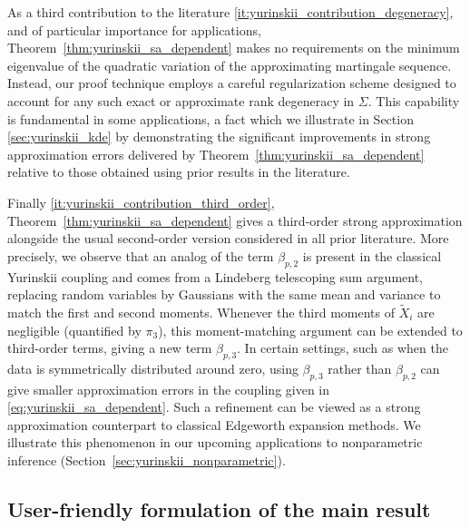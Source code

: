 As a third contribution to the literature
\ref{it:yurinskii_contribution_degeneracy}, and
of particular importance for applications,
Theorem~\ref{thm:yurinskii_sa_dependent} makes
no requirements on the minimum eigenvalue of the quadratic variation of the
approximating martingale sequence. Instead, our proof technique employs a
careful regularization scheme designed to account for any such exact or
approximate rank degeneracy in $\Sigma$. This capability is fundamental in some
applications, a fact which we illustrate in Section \ref{sec:yurinskii_kde} by
demonstrating the significant improvements in strong approximation errors
delivered by Theorem~\ref{thm:yurinskii_sa_dependent} relative to those
obtained using
prior results in the literature.

Finally \ref{it:yurinskii_contribution_third_order},
Theorem~\ref{thm:yurinskii_sa_dependent} gives
a third-order strong approximation alongside the usual second-order
version considered in all prior literature.
More precisely, we observe that an analog of the term
$\beta_{p,2}$ is present in the
classical Yurinskii coupling and comes from a Lindeberg
telescoping sum argument,
replacing random variables by Gaussians with the same mean
and variance to match the first and second moments.
Whenever the third moments of $\tilde X_i$ are negligible
(quantified by $\pi_3$), this moment-matching argument can be extended to
third-order terms, giving a new term $\beta_{p,3}$.
In certain settings, such as when the data is symmetrically
distributed around zero, using $\beta_{p,3}$ rather than $\beta_{p,2}$
can give smaller approximation errors in the coupling given in
\eqref{eq:yurinskii_sa_dependent}.
Such a refinement can be viewed as a strong approximation counterpart
to classical Edgeworth expansion methods.
We illustrate this phenomenon in our
upcoming applications to nonparametric inference
(Section~\ref{sec:yurinskii_nonparametric}).

\subsection{User-friendly formulation of the main result}%

